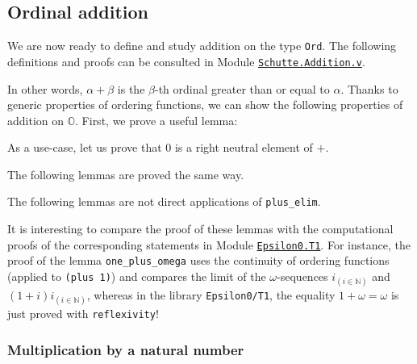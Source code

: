 \subsection{Ordinal addition}

We are now ready to define and study addition on the type \texttt{Ord}.
The following definitions and proofs can be consulted in Module
\href{../theories/html/hydras.Schutte.Addition.html}%
{\texttt{Schutte.Addition.v}}.




In other words,  $\alpha + \beta$ is the  $\beta$-th ordinal greater than or equal to $\alpha$. 
Thanks to generic properties of ordering functions, we can show the following 
properties of addition on $\mathbb{O}$. First, we prove a useful lemma:



As a use-case, let us prove that $0$ is a right neutral element of $+$.




The following lemmas are proved the same way.




The following lemmas are not direct applications of \texttt{plus\_elim}.



  


It is interesting to compare the proof of these lemmas with the
computational proofs of the corresponding statements in Module
\href{../theories/html/hydras.Epsilon0.T1.html}%
{\texttt{Epsilon0.T1}}. 
For instance, the proof of the lemma 
\texttt{one\_plus\_omega} uses the continuity of ordering functions (applied to  \texttt{(plus 1)}) and compares the limit of the $\omega$-sequences $i_{(i \in \mathbb{N})}$ and
$(1+i)i_{(i \in \mathbb{N})}$, whereas in the library  \texttt{Epsilon0/T1}, the equality 
$1+\omega=\omega$ is just proved with \texttt{reflexivity}!



\subsubsection{Multiplication by a natural number}


